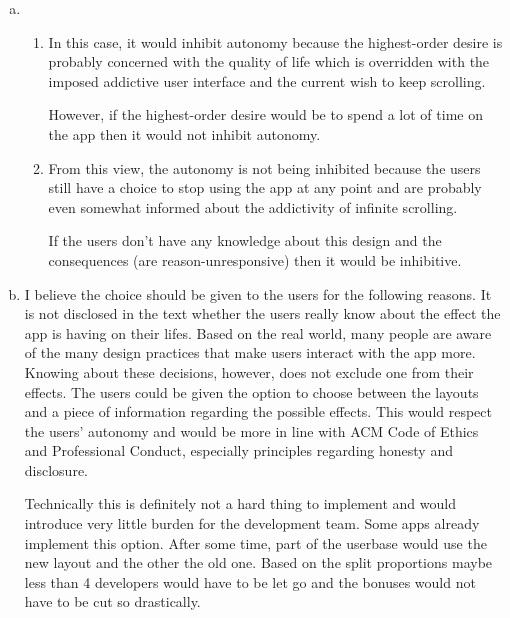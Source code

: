 \documentclass[a4paper, 11pt]{article}
\begin{document}
\begin{enumerate}[a)]
    \item
    \begin{enumerate}[1]
        \item
        In this case, it would inhibit autonomy because the highest-order desire is probably concerned with the quality of life which is overridden with the imposed addictive user interface and the current wish to keep scrolling.
        
        However, if the highest-order desire would be to spend a lot of time on the app then it would not inhibit autonomy.
        
        \item
        From this view, the autonomy is not being inhibited because the users still have a choice to stop using the app at any point and are probably even somewhat informed about the addictivity of infinite scrolling.
        
        If the users don't have any knowledge about this design and the consequences (are reason-unresponsive) then it would be inhibitive.
    \end{enumerate}
    
    \item
    I believe the choice should be given to the users for the following reasons.
    It is not disclosed in the text whether the users really know about the effect the app is having on their lifes.
    Based on the real world, many people are aware of the many design practices that make users interact with the app more.
    Knowing about these decisions, however, does not exclude one from their effects.
    The users could be given the option to choose between the layouts and a piece of information regarding the possible effects.
    This would respect the users' autonomy and would be more in line with ACM Code of Ethics and Professional Conduct, especially principles regarding honesty and disclosure.
    
    Technically this is definitely not a hard thing to implement and would introduce very little burden for the development team.
    Some apps already implement this option.
    After some time, part of the userbase would use the new layout and the other the old one.
    Based on the split proportions maybe less than 4 developers would have to be let go and the bonuses would not have to be cut so drastically.
\end{enumerate}

\end{document}

